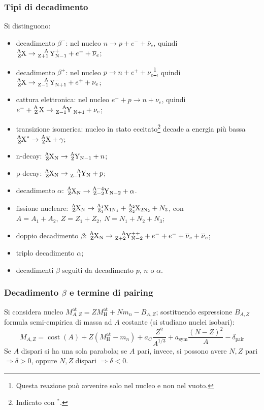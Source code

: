 \documentclass[10pt, a4paper]{scrartcl}
\numberwithin{equation}{subsection}
\theoremstyle{style1}
\begin{document}
\subsubsection{Tipi di decadimento}

Si distinguono:
\begin{itemize}
	\item decadimento $\beta ^-$: nel nucleo $n\to p + e^- + \overline{\nu }_e$, quindi $\ce{^A_ZX}\to \ce{^A_{Z+1} Y^+_{N-1} } + e^- + \overline{\nu }_e$;
\item decadimento $\beta ^+$: nel nucleo $p \to n+ e^+ + \nu _e$\footnote{Questa reazione pu\`o avvenire solo nel nucleo e non nel vuoto.}, quindi $\ce{^A_ZX}\to\ce{^A_{Z-1} Y^-_{N+1}} +e^+ + \nu _e$;
\item cattura elettronica: nel nucleo $e^- + p \to n +\nu _e$, quindi $e^- + \ce{^A_Z X}\to \ce{^A_{Z-1}Y _{N+1}} + \nu _e$;
\item transizione isomerica: nucleo in stato eccitato\footnote{Indicato con $^*$.} decade a energia pi\`u bassa $\ce{^A_ZX^*}\to \ce{_Z^AX}+\gamma$;
\item n-decay: $\ce{^A_ZX_N}\to\ce{^A_ZY_{N-1} } + n$;
\item p-decay: $\ce{^A_ZX_N}\to\ce{^A_{Z-1}Y_{N} } + p$;
\item decadimento $\alpha$: $\ce{^A_ZX_N}\to \ce{^{A-4}_{Z-2}Y_{N-2} }+\alpha $.
\item fissione nucleare: $\ce{^A_ZX_N}\to \ce{^{A_1}_{Z_1}X_{1N_1} }+\ce{^{A_2}_{Z_2}X_{2N_2} } + N_3$, con $A = A_1 + A_2, \ Z = Z_1+Z_2, \ N = N_1+N_2+N_3$;
\item doppio decadimento $\beta $: $\ce{^A_ZX_N}\to \ce{^A_{Z+2}Y^{++}_{N-2}} + e^- + e^- + \overline{\nu }_e + \overline{\nu }_e$;
\item triplo decadimento $\alpha $;
\item decadimenti $\beta $ seguiti da decadimento $p$, $n$ o $\alpha $.
\end{itemize}
\subsubsection{Decadimento $\beta $ e termine di pairing}

Si considera nucleo $M_{A,Z} ^\text{at} = Z M_\text{H}^\text{at} + Nm_n - B_{A,Z} $; sostituendo espressione $B_{A,Z} $ formula semi-empirica di massa ad $A$ costante (si studiano nuclei isobari):
\[
M_{A,Z} = \operatorname{cost} (A) +Z (M_\text{H}^\text{at} - m_n) + a_C \frac{Z^2}{A^{1 / 3} } + a_\text{sym} \frac{(N-Z)^2}{A}- \delta _\text{pair}
\] 
Se $A$ dispari si ha una sola parabola; se $A $ pari, invece, si possono avere $N,Z$ pari $\Rightarrow  \delta >0$, oppure $N,Z $ dispari $\Rightarrow \delta <0$.
\end{document}
